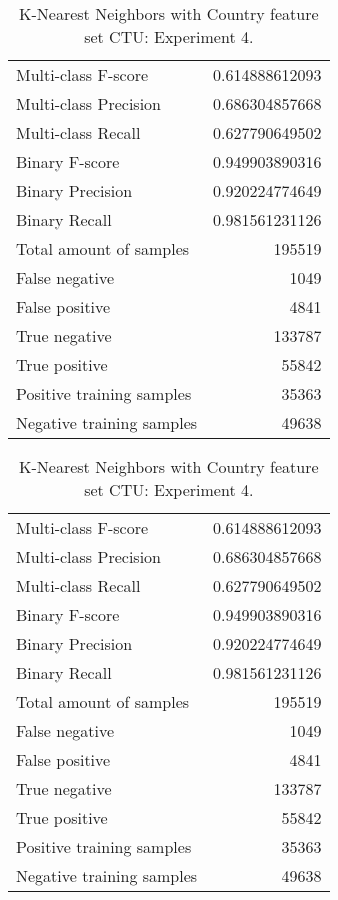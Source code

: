 \begin{table}[H]
\begin{minipage}{0.5\textwidth}
\caption{K-Nearest Neighbors with Country feature set CTU: Experiment 3.}
\centering
\begin{tabular}{l r}
\toprule
Multi-class F-score & 0.614888612093 \\
Multi-class Precision & 0.686304857668 \\
Multi-class Recall & 0.627790649502 \\
\midrule
Binary F-score & 0.949903890316 \\
Binary Precision & 0.920224774649 \\
Binary Recall & 0.981561231126 \\
\midrule
Total amount of samples & 195519 \\
False negative & 1049 \\
False positive & 4841 \\
True negative & 133787 \\
True positive & 55842 \\
\midrule
Positive training samples & 35363 \\
Negative training samples & 49638 \\
\bottomrule
\end{tabular}
\end{minipage}
\hfillx
\begin{minipage}{0.5\textwidth}
\caption{K-Nearest Neighbors with Country feature set CTU: Experiment 4.}
\centering
\begin{tabular}{l r}
\toprule
Multi-class F-score & 0.614888612093 \\
Multi-class Precision & 0.686304857668 \\
Multi-class Recall & 0.627790649502 \\
\midrule
Binary F-score & 0.949903890316 \\
Binary Precision & 0.920224774649 \\
Binary Recall & 0.981561231126 \\
\midrule
Total amount of samples & 195519 \\
False negative & 1049 \\
False positive & 4841 \\
True negative & 133787 \\
True positive & 55842 \\
\midrule
Positive training samples & 35363 \\
Negative training samples & 49638 \\
\bottomrule
\end{tabular}
\end{minipage}
\end{table}
